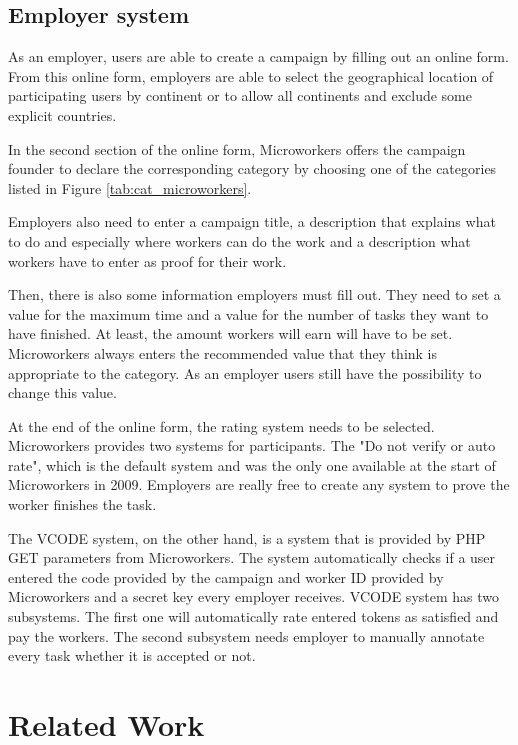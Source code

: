\subsection{Employer system}

As an employer, users are able to create a campaign by filling out an online form. From this online form, employers are able to select the geographical location of participating users by continent or to allow all continents and exclude some explicit countries.

In the second section of the online form, Microworkers offers the campaign founder to declare the corresponding category by choosing one of the categories listed in Figure \ref{tab:cat_microworkers}.

Employers also need to enter a campaign title, a description that explains what to do and especially where workers can do the work and a description what workers have to enter as proof for their work.

Then, there is also some information employers must fill out. They need to set a value for the maximum time and a value for the number of tasks they want to have finished. At least, the amount workers will earn will have to be set. Microworkers always enters the recommended value that they think is appropriate to the category. As an employer users still have the possibility to change this value.


At the end of the online form, the rating system needs to be selected.
Microworkers provides two systems for participants. The "Do not verify or auto rate", which is the default system and was the only one available at the start of Microworkers in 2009.
Employers are really free to create any system to prove the worker finishes the task.

The VCODE system, on the other hand, is a system that is provided by PHP GET parameters from Microworkers. The system automatically checks if a user entered the code provided by the campaign and worker ID provided by Microworkers and a secret key every employer receives.
VCODE system has two subsystems. The first one will automatically rate entered tokens as satisfied and pay the workers. The second subsystem needs employer to manually annotate every task whether it is accepted or not.


\newpage
\section{Related Work}

